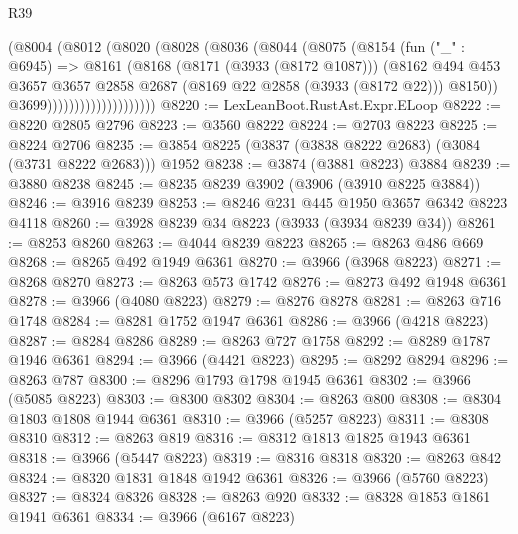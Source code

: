 \begin{lexlean}{R39}
\begin{coremodule}
                          (@8004
                            (@8012
                              (@8020
                                (@8028
                                  (@8036
                                    (@8044
                                      (@8075
                                        (@8154
                                          (fun ("_" : @6945) =>
                                          @8161
                                            (@8168
                                              (@8171 (@3933 (@8172 @1087)))
                                              (@8162
                                                @494
                                                @453
                                                @3657
                                                @3657
                                                @2858
                                                @2687
                                                (@8169 @22 @2858 (@3933 (@8172 @22)))
                                                @8150))
                                            @3699))))))))))))))))))))
@8220 := LexLeanBoot.RustAst.Expr.ELoop
@8222 := @8220 @2805 @2796
@8223 := @3560 @8222
@8224 := @2703 @8223
@8225 := @8224 @2706
@8235 := @3854 @8225 (@3837 (@3838 @8222 @2683) (@3084 (@3731 @8222 @2683))) @1952
@8238 := @3874 (@3881 @8223) @3884
@8239 := @3880 @8238
@8245 := @8235 @8239 @3902 (@3906 (@3910 @8225 @3884))
@8246 := @3916 @8239
@8253 := @8246 @231 @445 @1950 @3657 @6342 @8223 @4118
@8260 := @3928 @8239 @34 @8223 (@3933 (@3934 @8239 @34))
@8261 := @8253 @8260
@8263 := @4044 @8239 @8223
@8265 := @8263 @486 @669
@8268 := @8265 @492 @1949 @6361
@8270 := @3966 (@3968 @8223)
@8271 := @8268 @8270
@8273 := @8263 @573 @1742
@8276 := @8273 @492 @1948 @6361
@8278 := @3966 (@4080 @8223)
@8279 := @8276 @8278
@8281 := @8263 @716 @1748
@8284 := @8281 @1752 @1947 @6361
@8286 := @3966 (@4218 @8223)
@8287 := @8284 @8286
@8289 := @8263 @727 @1758
@8292 := @8289 @1787 @1946 @6361
@8294 := @3966 (@4421 @8223)
@8295 := @8292 @8294
@8296 := @8263 @787
@8300 := @8296 @1793 @1798 @1945 @6361
@8302 := @3966 (@5085 @8223)
@8303 := @8300 @8302
@8304 := @8263 @800
@8308 := @8304 @1803 @1808 @1944 @6361
@8310 := @3966 (@5257 @8223)
@8311 := @8308 @8310
@8312 := @8263 @819
@8316 := @8312 @1813 @1825 @1943 @6361
@8318 := @3966 (@5447 @8223)
@8319 := @8316 @8318
@8320 := @8263 @842
@8324 := @8320 @1831 @1848 @1942 @6361
@8326 := @3966 (@5760 @8223)
@8327 := @8324 @8326
@8328 := @8263 @920
@8332 := @8328 @1853 @1861 @1941 @6361
@8334 := @3966 (@6167 @8223)

\end{coremodule}
\end{lexlean}
